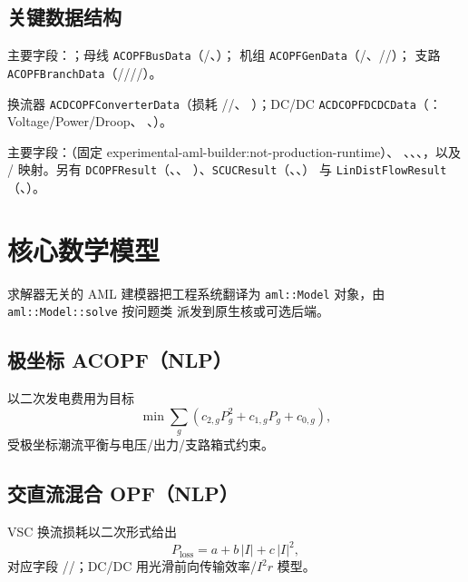 \documentclass[UTF8,fontset=fandol,a4paper,11pt]{ctexart}
\begin{document}
\subsection{关键数据结构}
主要字段：；母线 \texttt{ACOPFBusData}（/、）；
机组 \texttt{ACOPFGenData}（/、//）；
支路 \texttt{ACOPFBranchData}（////）。

换流器 \texttt{ACDCOPFConverterData}（损耗 //、
）；DC/DC \texttt{ACDCOPFDCDCData}（：Voltage/Power/Droop、
、）。

主要字段：（固定 experimental-aml-builder:not-production-runtime）、
、、、，以及
/ 映射。另有 \texttt{DCOPFResult}（、、
）、\texttt{SCUCResult}（、、）
与 \texttt{LinDistFlowResult}（、）。

\section{核心数学模型}
求解器无关的 AML 建模器把工程系统翻译为 \texttt{aml::Model} 对象，由 \texttt{aml::Model::solve} 按问题类
派发到原生核或可选后端。

\subsection{极坐标 ACOPF（NLP）}
以二次发电费用为目标
\begin{equation}
\min \sum_{g}\left(c_{2,g}P_g^2 + c_{1,g}P_g + c_{0,g}\right),
\end{equation}
受极坐标潮流平衡与电压/出力/支路箱式约束。

\subsection{交直流混合 OPF（NLP）}
VSC 换流损耗以二次形式给出
\begin{equation}
P_{\text{loss}} = a + b\,\lvert I\rvert + c\,\lvert I\rvert^2,
\end{equation}
对应字段 //；DC/DC 用光滑前向传输效率/$I^2r$ 模型。
\end{document}
